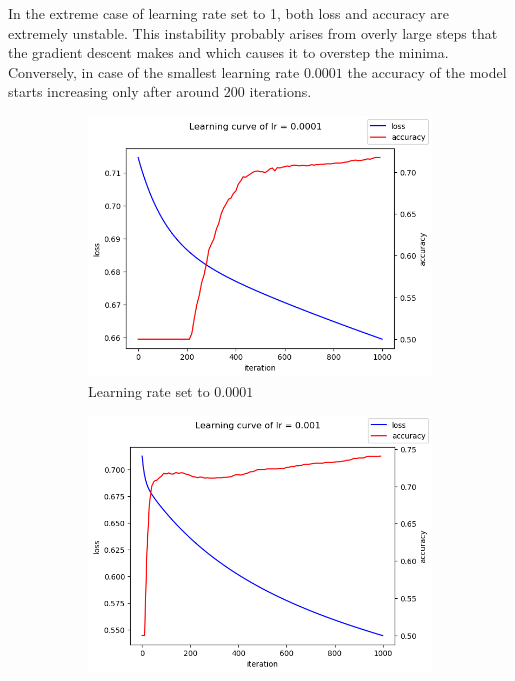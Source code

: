 \documentclass [a4paper, 11pt] {article}
\begin{document}
\begin{enumerate}
In the extreme case of learning rate set to 1, both loss and accuracy are extremely unstable. This instability probably arises from overly large steps that the gradient descent makes and which causes it to overstep the minima. Conversely, in case of the smallest learning rate $0.0001$ the accuracy of the model starts increasing only after around $200$ iterations.

\begin{figure}[!h]
	\centering
	\begin{subfigure}{0.4\textwidth}
		\centering
		\includegraphics[width=\textwidth]{img/2_1_e_0-0001.png}
		\caption{Learning rate set to $0.0001$}
		\label{fig:2a}
	\end{subfigure}
	\begin{subfigure}{0.4\textwidth}
		\centering
		\includegraphics[width=\textwidth]{img/2_1_e_0-001.png}

\end{subfigure}
\end{figure}
\end{enumerate}
\end{document}
